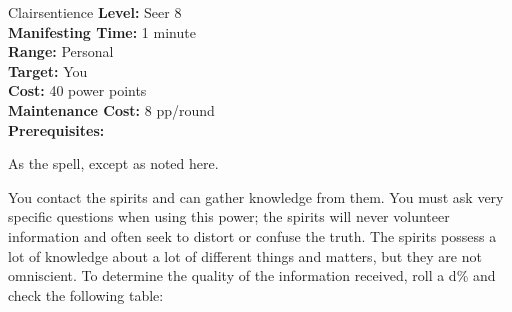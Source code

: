 {Clairsentience}
{
	\textbf{Level:}
	Seer 8\\
	\textbf{Manifesting Time:}
	1 minute\\
	\textbf{Range:}
	Personal\\
	\textbf{Target:}
	You\\
	\textbf{Cost:}
	40 power points\\
	\textbf{Maintenance Cost:}
	8 pp/round\\
	\textbf{Prerequisites:}
	\\
}
{
	As the  spell, except as noted here.

	You contact the spirits and can gather knowledge from them.	You must ask very specific questions when using this power; the spirits will never volunteer information and often seek to distort or confuse the truth. The spirits possess a lot of knowledge about a lot of different things and matters, but they are not omniscient. To determine the quality of the information received, roll a d\% and check the following table:

}